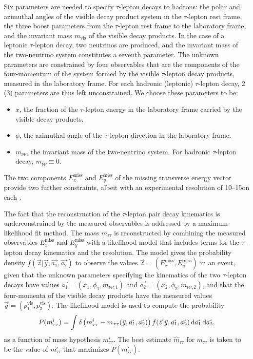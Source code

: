 \documentclass[11pt,twoside,a4paper,cmspaper,final,collab]{cms-tdr}
\begin{document}
Six parameters are needed to specify $\tau$-lepton decays to hadrons:
the polar and azimuthal angles of the visible decay product system in the $\tau$-lepton rest frame, the three boost parameters from the $\tau$-lepton rest frame to the laboratory frame, and the invariant mass $m_\text{vis}$ of the visible decay products.
In the case of a leptonic $\tau$-lepton decay, two neutrinos are produced,
and the invariant mass of the two-neutrino system constitutes a seventh parameter.
The unknown parameters are constrained by four observables that are the components of the four-momentum
of the system formed by the visible $\tau$-lepton decay products, measured in the laboratory frame.
For each hadronic (leptonic) $\tau$-lepton decay, 2 (3) parameters are thus left unconstrained.
We choose these parameters to be:
\begin{itemize}
\item $x$, the fraction of the $\tau$-lepton energy in the laboratory frame carried by the visible decay products.
\item $\phi$, the azimuthal angle of the $\tau$-lepton direction in the laboratory frame.
\item $m_{\nu\nu}$, the invariant mass of the two-neutrino system. For hadronic $\tau$-lepton decay, $m_{\nu\nu} \equiv 0$.
\end{itemize}
The two components $E_{x}^\text{miss}$ and $E_{y}^\text{miss}$ of the missing transverse energy vector provide two further constraints,
albeit with an experimental resolution of 10--15\GeV on each \cite{PFMEtSignAlgo}.

The fact that the reconstruction of the $\tau$-lepton pair decay kinematics is underconstrained by the measured observables
is addressed by a maximum-likelihood fit method.
The mass $m_{\tau\tau}$ is reconstructed by combining the measured observables $E_{x}^\text{miss}$ and $E_{y}^\text{miss}$ with a likelihood  model
that includes terms for the $\tau$-lepton decay kinematics and the \MET resolution.
The model gives the probability density $f(\vec{z} \vert \vec{y}, \vec{a_1}, \vec{a_2})$
to observe the values $\vec{z} = (E_{x}^\text{miss}, E_{y}^\text{miss})$ in an event,
given that the unknown parameters specifying the kinematics of the two $\tau$-lepton decays have values
$\vec{a_1} = (x_{1}, \phi_{1}, m_{\nu\nu,1})$ and $\vec{a_2} = (x_{2}, \phi_{2}, m_{\nu\nu,2})$,
and that the four-momenta of the visible decay products have the measured values $\vec{y} = (p^\text{vis}_{1}, p^\text{vis}_{2})$.
The likelihood model is used to compute the probability
\begin{equation}
P(m_{\tau\tau}^{i}) = \int \delta \left( m_{\tau\tau}^{i} - m_{\tau\tau}(\vec{y}, \vec{a_1}, \vec{a_2}) \right) f(\vec{z} \vert \vec{y}, \vec{a_1}, \vec{a_2})\, \mathrm{d}\vec{a_1}\,\mathrm{d}\vec{a_2},
\label{eq:mtautau}
\end{equation}
as a function of mass hypothesis $m_{\tau\tau}^{i}$.
The best estimate $\hat{m}_{\tau\tau}$ for $m_{\tau\tau}$ is taken to be the value of $m_{\tau\tau}^{i}$ that maximizes $P(m_{\tau\tau}^{i})$.
\end{document}
